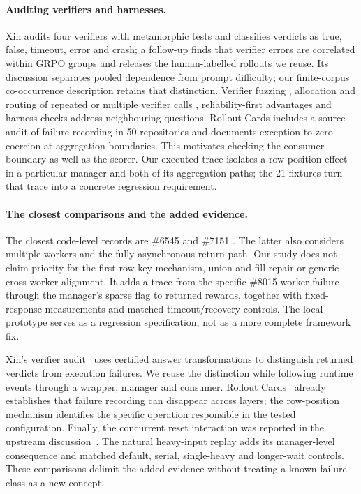 \documentclass[10pt,a4paper]{article}
\let\cite\citep
\begin{document}
\paragraph{Auditing verifiers and harnesses.}
Xin \cite{xin2026wherefails} audits four verifiers with metamorphic tests and
classifies verdicts as true, false, timeout, error and crash; a follow-up
\cite{xin2026groupcorr} finds that verifier errors are correlated within GRPO
groups and releases the human-labelled rollouts we reuse. Its discussion
separates pooled dependence from prompt difficulty; our finite-corpus
co-occurrence description retains that distinction. Verifier fuzzing \cite{ray2026fuzzing}, allocation and routing of repeated
or multiple verifier calls \cite{hu2026vstress,hu2026routeaudit},
reliability-first advantages \cite{tian2026stargrpo} and harness checks
\cite{pan2026probe} address neighbouring questions. Rollout Cards
\cite{masters2026rolloutcards} includes a source audit of failure recording
in 50 repositories and documents exception-to-zero coercion at aggregation
boundaries. This motivates checking the consumer boundary as well as the
scorer. Our executed trace isolates a row-position effect in a particular
manager and both of its aggregation paths; the 21 fixtures turn that trace
into a concrete regression requirement.

\paragraph{The closest comparisons and the added evidence.}
The closest code-level records are \#6545 and \#7151
\cite{verl6545,verl7151}. The latter also considers multiple workers and
the fully asynchronous return path. Our study does not claim priority for
the first-row-key mechanism, union-and-fill repair or generic cross-worker
alignment. It adds a trace from the specific \#8015 worker failure through
the manager's sparse flag to returned rewards, together with fixed-response
measurements and matched timeout/recovery controls. The local prototype
serves as a regression specification, not as a more complete framework fix.

Xin's verifier audit~\cite{xin2026wherefails} uses certified answer
transformations to distinguish returned verdicts from execution failures.
We reuse the distinction while following runtime events through a wrapper,
manager and consumer. Rollout Cards~\cite{masters2026rolloutcards} already
establishes that failure recording can disappear across layers; the
row-position mechanism identifies the specific operation responsible in
the tested configuration. Finally, the concurrent reset interaction was
reported in the upstream discussion~\cite{verl8015discussion}. The natural
heavy-input replay adds its manager-level consequence and matched default,
serial, single-heavy and longer-wait controls. These comparisons delimit
the added evidence without treating a known failure class as a new concept.
\end{document}
